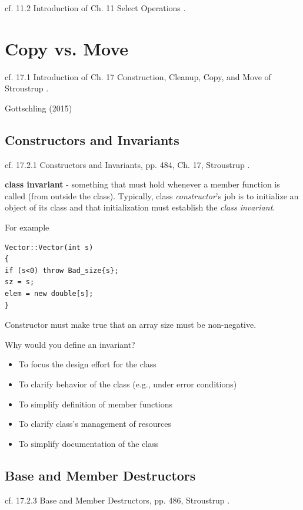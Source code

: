 \documentclass[10pt]{amsart}
\begin{document}
cf. 11.2 Introduction of Ch. 11 Select Operations \cite{Stro2013}.  




\section{Copy vs. Move}  
cf. 17.1 Introduction of Ch. 17 Construction, Cleanup, Copy, and Move of Stroustrup \cite{Stro2013}.  

Gottschling (2015) \cite{Gott2015}


\subsection{Constructors and Invariants}

cf. 17.2.1 Constructors and Invariants, pp. 484, Ch. 17, Stroustrup \cite{Stro2013}.

\textbf{class invariant} - something that must hold whenever a member function is called (from outside the class). Typically, class \emph{constructor}'s job is to initialize an object of its class and that initialization must establish the \emph{class invariant}.

For example
\begin{lstlisting}
Vector::Vector(int s)
{
if (s<0) throw Bad_size{s};
sz = s;
elem = new double[s];
}
\end{lstlisting}

Constructor must make true that an array size must be non-negative.

Why would you define an invariant?
\begin{itemize}
	\item To focus the design effort for the class
	\item To clarify behavior of the class (e.g., under error conditions)
	\item To simplify definition of member functions
	\item To clarify class's management of resources
	\item To simplify documentation of the class
\end{itemize}

\subsection{Base and Member Destructors}

cf. 17.2.3 Base and Member Destructors, pp. 486, Stroustrup \cite{Stro2013}.
\end{document}
